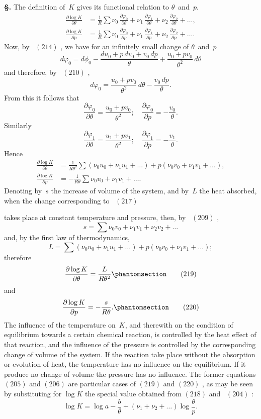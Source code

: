\documentclass[12pt]{book}[2005/09/16]
\newcommand{\Chg}[2]{#2}
\newcommand{\Add}[1]{\Chg{}{#1}}
\newcommand{\Section}[1]{
  \medskip\par\textbf{§\;#1}
  \label{section:#1}
}
\newcommand{\Tag}[1]{%
  \phantomsection\label{eqn:#1}\tag*{\ensuremath{#1}}%
}
\newcommand{\Eq}[1]{%
  \hyperref[eqn:#1]{\ensuremath{#1}}%
}
\newcommand{\PageSep}[1]{\ignorespaces}
\newcommand{\dd}{\partial}
\newcommand{\tsum}{\mathop{\textstyle\sum}\limits}
\begin{document}
\Section{257.} The definition of~$K$ gives its functional relation
to $\theta$~and~$p$.
\begin{align*}
\frac{\dd \log K}{\dd \theta}
  &= \frac{1}{R} \tsum \nu_{0}\, \frac{\dd \varphi_{0}}{\dd \theta} + \nu_{1}\, \frac{\dd \varphi_{1}}{\dd \theta} +\nu_{2}\, \frac{\dd \varphi_{2}}{\dd \theta} + \dots\Add{,} \\
\frac{\dd \log K}{\dd p}
  &= \frac{1}{R} \tsum \nu_{0}\, \frac{\dd \varphi_{0}}{\dd p} + \nu_{1}\, \frac{\dd \varphi_{1}}{\dd p} +\nu_{2}\, \frac{\dd \varphi_{2}}{\dd p} + \dots\Add{.}
\end{align*}
\PageSep{231}
Now, by~\Eq{(214)}, we have for an infinitely small change
of $\theta$~and~$p$
\[
d\varphi_{0} = d\phi_{0} - \frac{du_{0} + p\, dv_{0} + v_{0}\, dp}{\theta} + \frac{u_{0} + pv_{0}}{\theta^{2}}\, d\theta
\]
and therefore, by~\Eq{(210)},
\[
d\varphi_{0} = \frac{u_{0} + pv_{0}}{\theta^{2}}\, d\theta - \frac{v_{0}\, dp}{\theta}.
\]
From this it follows that
\[
\frac{\dd \varphi_{0}}{\dd \theta} = \frac{u_{0} + pv_{0}}{\theta^{2}};\quad
\frac{\dd \varphi_{0}}{\dd p} = -\frac{v_{0}}{\theta}.
\]
Similarly
\[
\frac{\dd \varphi_{1}}{\dd \theta} = \frac{u_{1} + pv_{1}}{\theta^{2}};\quad
\frac{\dd \varphi_{1}}{\dd p} = -\frac{v_{1}}{\theta}.
\]
Hence
\begin{align*}
\frac{\dd \log K}{\dd \theta}
  &= \frac{1}{R\theta^{2}} \tsum (\nu_{0} u_{0} + \nu_{1} u_{1} + \dots) + p(\nu_{0} v_{0} + \nu_{1} v_{1} + \dots), \\
\frac{\dd \log K}{\dd p}
  &= -\frac{1}{R\theta} \tsum \nu_{0} v_{0} + \nu_{1} v_{1} + \dots\Add{.}
\end{align*}
Denoting by~$s$ the increase of volume of the system, and
by~$L$ the heat absorbed, when the change corresponding to~\Eq{(217)}
takes place at constant temperature and pressure,
then, by~\Eq{(209)},
\[
s = \tsum \nu_{0} v_{0} + \nu_{1} v_{1} + \nu_{2} v_{2} + \dots
\]
and, by the first law of thermodynamics,
\[
L = \tsum (\nu_{0} u_{0} + \nu_{1} u_{1} + \dots) + p(\nu_{0} v_{0} + \nu_{1} v_{1} + \dots);
\]
therefore
\[
\frac{\dd \log K}{\dd \theta} = \frac{L}{R\theta^{2}}
\Tag{(219)}
\]
\PageSep{232}
and
\[
\frac{\dd \log K}{\dd p} = -\frac{s}{R\theta}\Add{.}
\Tag{(220)}
\]
The influence of the temperature on~$K$, and therewith
on the condition of equilibrium towards a certain chemical
reaction, is controlled by the heat effect of that reaction,
and the influence of the pressure is controlled by the corresponding
change of volume of the system. If the reaction
take place without the absorption or evolution of heat, the
temperature has no influence on the equilibrium. If it
produce no change of volume the pressure has no influence.
The former equations \Eq{(205)} and \Eq{(206)} are particular cases
of \Eq{(219)} and \Eq{(220)}, as may be seen by substituting for
$\log K$ the special value obtained from \Eq{(218)} and~\Eq{(204)}:
\[
\log K = \log a - \frac{b}{\theta} + (\nu_{1} + \nu_{2} + \dots) \log \frac{\theta}{p}.
\]
\end{document}
